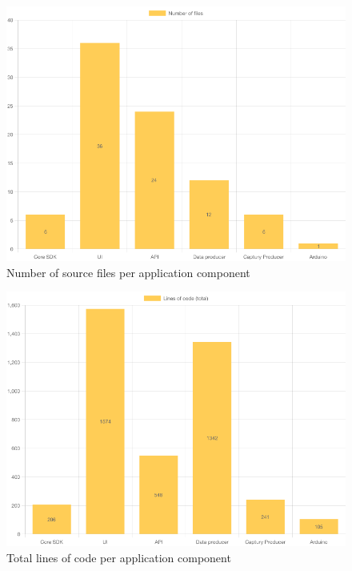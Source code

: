 \begin{figure}[h]
\centering
\includegraphics[scale=0.5]{04_Artefakte/01_Abbildungen/code-stats-filecount}
\caption[File count]{Number of source files per application component\protect}
\label{fig:fileCount}
\end{figure}

\begin{figure}[h]
\centering
\includegraphics[scale=0.5]{04_Artefakte/01_Abbildungen/code-stats-loc-total}
\caption[Lines of code (total)]{Total lines of code per application component\protect}
\label{fig:linesOfCodeTotal}
\end{figure}

